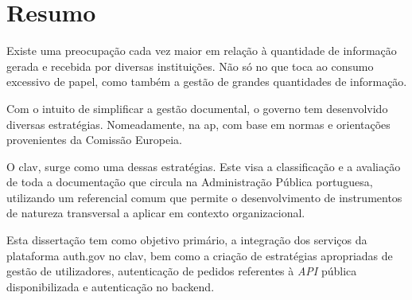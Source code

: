 \chapter*{Resumo}

Existe uma preocupação cada vez maior em relação à quantidade de informação gerada e recebida por diversas instituições. Não só no que toca ao consumo excessivo de papel, como também a gestão de grandes quantidades de informação.

Com o intuito de simplificar a gestão documental, o governo tem desenvolvido diversas estratégias. Nomeadamente, na \gls{ap}, com base em normas e orientações provenientes da Comissão Europeia.

O \gls{clav}, surge como uma dessas estratégias. Este visa a classificação e a avaliação de toda a documentação que circula na Administração Pública portuguesa, utilizando um referencial comum que permite o desenvolvimento de instrumentos de natureza transversal a aplicar em contexto organizacional.

Esta dissertação tem como objetivo primário, a integração dos serviços da plataforma \gls{auth.gov} no \gls{clav}, bem como a criação de estratégias apropriadas de gestão de utilizadores, autenticação de pedidos referentes à \emph{API} pública disponibilizada e autenticação no backend.